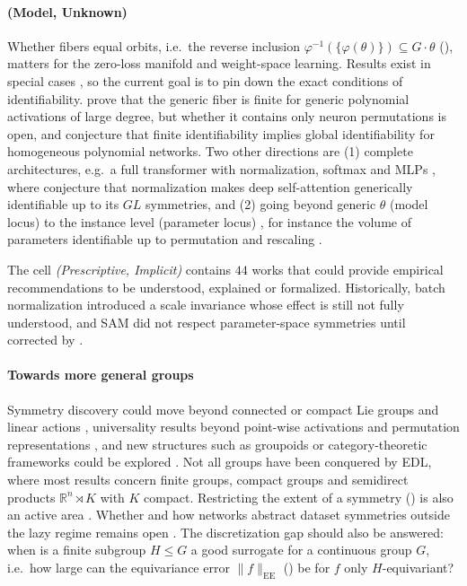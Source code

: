 \documentclass[mathematics,review,submit,moreauthors]{Definitions/mdpi}
\begin{document}
\paragraph{(Model, Unknown)}
Whether fibers equal orbits, i.e.\ the reverse inclusion $\varphi^{-1}(\{\varphi(\theta)\})\subseteq G\cdot\theta$ (), matters for the zero-loss manifold and weight-space learning.
Results exist in special cases \citep{phuong2019,bona-pellissier2023,marchetti2025a,gegenfurtner2026,usevich2025}, so the current goal is to pin down the exact conditions of identifiability.
\citet{shahverdi2026} prove that the generic fiber is finite for generic polynomial activations of large degree, but whether it contains only neuron permutations is open, and \citet{usevich2025} conjecture that finite identifiability implies global identifiability for homogeneous polynomial networks.
Two other directions are (1) complete architectures, e.g.\ a full transformer with normalization, softmax and MLPs \citep{tran2025iclr,zhang2025p4icml}, where \citet{henry2025} conjecture that normalization makes deep self-attention generically identifiable up to its $GL$ symmetries, and (2) going beyond generic $\theta$ (model locus) to the instance level (parameter locus) \citep{grigsby2023p4icml,grillo2026}, for instance the volume of parameters identifiable up to permutation and rescaling \citep{grillo2026}.

\vspace{5mm}

The cell \emph{(Prescriptive, Implicit)} contains $44$ works that could provide empirical recommendations to be understood, explained or formalized.
Historically, batch normalization \citep{ioffe2015p3icml} introduced a scale invariance whose effect is still not fully understood, and SAM \citep{foret2021} did not respect parameter-space symmetries until corrected by \citet{kwon2021p3icml}.

\paragraph{Towards more general groups}
Symmetry discovery could move beyond connected or compact Lie groups and linear actions \citep{ennes2025fcm,escriche2025}, universality results beyond point-wise activations and permutation representations \citep{pacini2026}, and new structures such as groupoids or category-theoretic frameworks could be explored \citep{sareen2026,basheer2025ijdsa}.
Not all groups have been conquered by EDL, where most results concern finite groups, compact groups and semidirect products $\mathbb{R}^n\rtimes K$ with $K$ compact.
Restricting the extent of a symmetry () is also an active area \citep{goel2025,urbano2026}.
Whether and how networks abstract dataset symmetries outside the lazy regime remains open \citep{perin2025,jacot2025}.
The discretization gap \citep{ennes2025fcm,ali2026} should also be answered: when is a finite subgroup $H\le G$ a good surrogate for a continuous group $G$, i.e.\ how large can the equivariance error $\lVert f\rVert_{\mathrm{EE}}$ () be for $f$ only $H$-equivariant?
\end{document}

